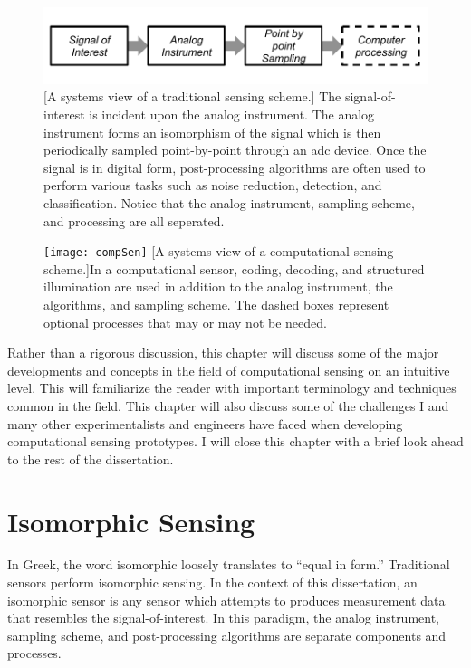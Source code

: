 \begin{figure}
    \centering
    \includegraphics[scale=1]{isomorphicsensorflowchart}
    [A systems view of a traditional sensing scheme.]{ The signal-of-interest is incident upon the analog instrument. The analog instrument forms an isomorphism of the signal which is then periodically sampled point-by-point through an \gls{adc} device. Once the signal is in digital form, post-processing algorithms are often used to perform various tasks such as noise reduction, detection, and classification. Notice that the analog instrument, sampling scheme, and processing are all seperated. }
    \label{fig:isomorphicsesingflowchart}
\end{figure}


\begin{figure}
	\texttt{[image: compSen]}
	[A systems view of a computational sensing scheme.]{In a computational sensor, coding, decoding, and structured illumination are used in addition to the analog instrument, the algorithms, and sampling scheme. The dashed boxes represent optional processes that may or may not be needed. }
	\label{fig:compSen}
\end{figure}

Rather than a rigorous discussion, this chapter will discuss some of the major developments and concepts in the field of computational sensing on an intuitive level. This will familiarize the reader with important terminology and techniques common in the field. This chapter will also discuss some of the challenges I and many other experimentalists and engineers have faced when developing computational sensing prototypes. I will close this chapter with a brief look ahead to the rest of the dissertation. 


\section{Isomorphic Sensing}\label{sec:Isomorphic Sensing}

In Greek, the word isomorphic loosely translates to ``equal in form.'' Traditional sensors perform isomorphic sensing. In the context of this dissertation, an isomorphic sensor is any sensor which attempts to produces measurement data that resembles the signal-of-interest. In this paradigm, the analog instrument, sampling scheme, and post-processing algorithms are separate components and processes.


